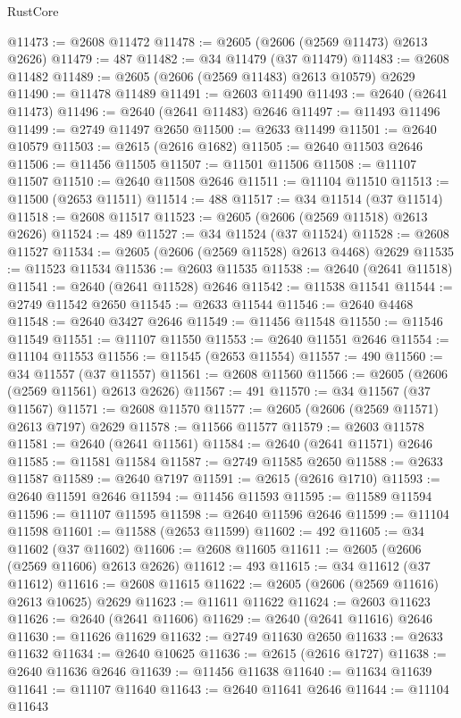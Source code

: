 \begin{lexlean}{RustCore}
\begin{coremodule}
@11473 := @2608 @11472
@11478 := @2605 (@2606 (@2569 @11473) @2613 @2626)
@11479 := 487
@11482 := @34 @11479 (@37 @11479)
@11483 := @2608 @11482
@11489 := @2605 (@2606 (@2569 @11483) @2613 @10579) @2629
@11490 := @11478 @11489
@11491 := @2603 @11490
@11493 := @2640 (@2641 @11473)
@11496 := @2640 (@2641 @11483) @2646
@11497 := @11493 @11496
@11499 := @2749 @11497 @2650
@11500 := @2633 @11499
@11501 := @2640 @10579
@11503 := @2615 (@2616 @1682)
@11505 := @2640 @11503 @2646
@11506 := @11456 @11505
@11507 := @11501 @11506
@11508 := @11107 @11507
@11510 := @2640 @11508 @2646
@11511 := @11104 @11510
@11513 := @11500 (@2653 @11511)
@11514 := 488
@11517 := @34 @11514 (@37 @11514)
@11518 := @2608 @11517
@11523 := @2605 (@2606 (@2569 @11518) @2613 @2626)
@11524 := 489
@11527 := @34 @11524 (@37 @11524)
@11528 := @2608 @11527
@11534 := @2605 (@2606 (@2569 @11528) @2613 @4468) @2629
@11535 := @11523 @11534
@11536 := @2603 @11535
@11538 := @2640 (@2641 @11518)
@11541 := @2640 (@2641 @11528) @2646
@11542 := @11538 @11541
@11544 := @2749 @11542 @2650
@11545 := @2633 @11544
@11546 := @2640 @4468
@11548 := @2640 @3427 @2646
@11549 := @11456 @11548
@11550 := @11546 @11549
@11551 := @11107 @11550
@11553 := @2640 @11551 @2646
@11554 := @11104 @11553
@11556 := @11545 (@2653 @11554)
@11557 := 490
@11560 := @34 @11557 (@37 @11557)
@11561 := @2608 @11560
@11566 := @2605 (@2606 (@2569 @11561) @2613 @2626)
@11567 := 491
@11570 := @34 @11567 (@37 @11567)
@11571 := @2608 @11570
@11577 := @2605 (@2606 (@2569 @11571) @2613 @7197) @2629
@11578 := @11566 @11577
@11579 := @2603 @11578
@11581 := @2640 (@2641 @11561)
@11584 := @2640 (@2641 @11571) @2646
@11585 := @11581 @11584
@11587 := @2749 @11585 @2650
@11588 := @2633 @11587
@11589 := @2640 @7197
@11591 := @2615 (@2616 @1710)
@11593 := @2640 @11591 @2646
@11594 := @11456 @11593
@11595 := @11589 @11594
@11596 := @11107 @11595
@11598 := @2640 @11596 @2646
@11599 := @11104 @11598
@11601 := @11588 (@2653 @11599)
@11602 := 492
@11605 := @34 @11602 (@37 @11602)
@11606 := @2608 @11605
@11611 := @2605 (@2606 (@2569 @11606) @2613 @2626)
@11612 := 493
@11615 := @34 @11612 (@37 @11612)
@11616 := @2608 @11615
@11622 := @2605 (@2606 (@2569 @11616) @2613 @10625) @2629
@11623 := @11611 @11622
@11624 := @2603 @11623
@11626 := @2640 (@2641 @11606)
@11629 := @2640 (@2641 @11616) @2646
@11630 := @11626 @11629
@11632 := @2749 @11630 @2650
@11633 := @2633 @11632
@11634 := @2640 @10625
@11636 := @2615 (@2616 @1727)
@11638 := @2640 @11636 @2646
@11639 := @11456 @11638
@11640 := @11634 @11639
@11641 := @11107 @11640
@11643 := @2640 @11641 @2646
@11644 := @11104 @11643

\end{coremodule}
\end{lexlean}
